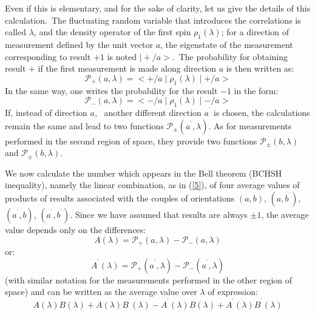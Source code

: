 \documentclass[12pt,onecolumn]{article}%
\begin{document}
Even if this is elementary, and for the sake of clarity, let us give the
details of this calculation.\ The fluctuating random variable that introduces
the correlations is called $\lambda$, and the density operator of the first
spin $\rho_{1}(\lambda)$; for a direction of measurement defined by the unit
vector $a$, the eigenstate of the measurement corresponding to result $+1$ is
noted $\mid+/a>$.\ The probability for obtaining result $+$ if the first
measurement is made along direction $a$ is then written as:
\begin{equation}
\mathcal{P}_{+}(a,\lambda)=<+/a\mid\rho_{1}(\lambda)\mid+/a> \label{aa1}%
\end{equation}
In the same way, one writes the probability for the result $-1$ in the form:
\begin{equation}
\mathcal{P}_{-}(a,\lambda)=<-/a\mid\rho_{1}(\lambda)\mid-/a> \label{aa2}%
\end{equation}
If, instead of direction $a$, \ another different direction $a^{^{\prime}}$ is
chosen, the calculations remain the same and lead to two functions
$\mathcal{P}_{\pm}(a^{^{\prime}},\lambda)$. As for measurements performed in
the second region of space, they provide two functions $\mathcal{P}_{\pm
}(b,\lambda)$ and $\mathcal{P}_{\pm}(b,\lambda)$.

We now calculate the number which appears in the Bell theorem (BCHSH
inequality), namely the linear combination, as in (\ref{5}), of four average
values of products of results associated with the couples of orientations
$(a,b)$, $(a,b^{^{\prime}})$, $(a^{^{\prime}},b)$, $(a^{^{\prime}}%
,b^{^{\prime}})$. Since we have assumed that results are always $\pm1$, the
average value depends only on the differences:
\begin{equation}
A(\lambda)=\mathcal{P}_{+}(a,\lambda)-\mathcal{P}_{-}(a,\lambda) \label{aa3}%
\end{equation}
or:
\begin{equation}
A^{^{\prime}}(\lambda)=\mathcal{P}_{+}(a^{^{\prime}},\lambda)-\mathcal{P}%
_{-}(a^{^{\prime}},\lambda) \label{aa4}%
\end{equation}
(with similar notation for the measurements performed in the other region of
space) and can be written as the average value over $\lambda$ of expression:
\begin{equation}
A(\lambda)B(\lambda)+A(\lambda)B^{^{\prime}}(\lambda)-A^{^{\prime}}%
(\lambda)B(\lambda)+A^{^{\prime}}(\lambda)B^{^{\prime}}(\lambda) \label{aa5}%
\end{equation}
\end{document}
